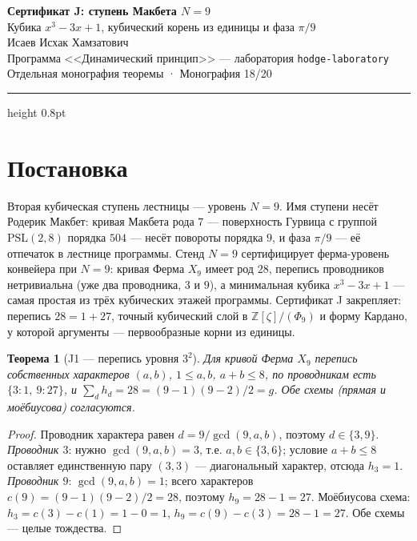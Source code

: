 \documentclass[11pt,a4paper]{article}
\theoremstyle{plain}
\newtheorem{theorem}{Теорема}
\theoremstyle{definition}
\theoremstyle{remark}
\newcommand{\ZZ}{\mathbb{Z}}
\begin{document}
\begin{center}
{\LARGE\bfseries Сертификат J: ступень Макбета $N=9$}\\[0.4em]
{\large Кубика $x^3-3x+1$, кубический корень из единицы и фаза $\pi/9$}\\[0.6em]
{\normalsize Исаев Исхак Хамзатович}\\[0.2em]
{\small Программа <<Динамический принцип>> --- лаборатория \texttt{hodge-laboratory}}\\[0.15em]
{\small Отдельная монография теоремы · Монография 18/20}
\end{center}
\vspace{0.4em}
{\color{linkblue}\hrule height 0.8pt}
\vspace{0.8em}

\section{Постановка}

Вторая кубическая ступень лестницы --- уровень $N=9$. Имя ступени
несёт Родерик Макбет: кривая Макбета рода $7$ --- поверхность
Гурвица с группой $\mathrm{PSL}(2,8)$ порядка $504$ --- несёт
повороты порядка $9$, и фаза $\pi/9$ --- её отпечаток в лестнице
программы. Стенд $N=9$ сертифицирует ферма-уровень конвейера при
$N=9$: кривая Ферма $X_9$ имеет род $28$, перепись проводников
нетривиальна (уже два проводника, $3$ и $9$), а минимальная
кубика $x^3-3x+1$ --- самая простая из трёх кубических этажей
программы. Сертификат J закрепляет: перепись
$28=1+27$, точный кубический слой в $\ZZ[\zeta]/(\Phi_9)$ и форму
Кардано, у которой аргументы --- первообразные корни из единицы.

\begin{theorem}[J1 --- перепись уровня $3^2$]\label{th:J1}
Для кривой Ферма $X_9$ перепись собственных характеров
$(a,b)$, $1\le a,b$, $a+b\le 8$, по проводникам есть
$\{3\colon 1,\ 9\colon 27\}$, и $\sum_d h_d = 28
= (9-1)(9-2)/2 = g$. Обе схемы (прямая и моёбиусова) согласуются.
\end{theorem}

\begin{proof}
Проводник характера равен $d=9/\gcd(9,a,b)$, поэтому $d\in\{3,9\}$.
\emph{Проводник $3$}: нужно $\gcd(9,a,b)=3$, т.е. $a,b\in\{3,6\}$;
условие $a+b\le 8$ оставляет единственную пару $(3,3)$ ---
диагональный характер, отсюда $h_3=1$. \emph{Проводник $9$}:
$\gcd(9,a,b)=1$; всего характеров $c(9)=(9-1)(9-2)/2=28$, поэтому
$h_9=28-1=27$. Моёбиусова схема: $h_3=c(3)-c(1)=1-0=1$,
$h_9=c(9)-c(3)=28-1=27$. Обе схемы --- целые тождества.
\end{proof}
\end{document}
